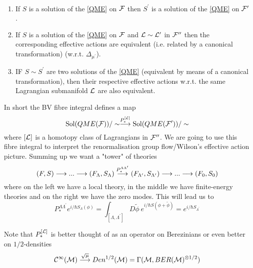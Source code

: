 \begin{corollary}~
  \begin{enumerate}
    \item If $S$ is a solution of the \eqref{QME} on ${\mathcal{F}}$ then $S^\prime$ is a solution of the \eqref{QME} on ${\mathcal{F}}^\prime$.

    \item If $S$ is a solution of the \eqref{QME} on ${\mathcal{F}}$ and $\mathcal{L} \sim \mathcal{L}^\prime$ in ${\mathcal{F}}^{\prime\prime}$ then the corresponding effective actions are equivalent (i.e. related by a canonical transformation) (w.r.t. $\Delta_{\mu^\prime}$).

    \item IF $S \sim S^\prime$ are two solutions of the \eqref{QME} (equivalent by means of a canonical transformation), then their respective effective actions w.r.t. the same Lagrangian submanifold $\mathcal{L}$ are also equivalent.
  \end{enumerate}
\end{corollary}

In short the BV fibre integral defines a map
\begin{equation}
  \operatorname{Sol}(QME({\mathcal{F}}))/\sim \overset{P_*^{[\mathcal{L}]}}{\longrightarrow} \operatorname{Sol}(QME({\mathcal{F}}^\prime))/\sim
\end{equation}
where $[\mathcal{L}]$ is a homotopy class of Lagrangians in ${\mathcal{F}}^{\prime\prime}$. We are going to use this fibre integral to interpret the renormalisation group flow/Wilson's effective action picture. Summing up we want a "tower" of theories
\begin{equation}
  (F,S) \longrightarrow ... \longrightarrow (F_\Lambda, S_\Lambda) \overset{P_*^{\Lambda \Lambda^\prime}}{\longrightarrow} (F_{\Lambda^\prime}, S_{\Lambda^\prime}) \longrightarrow ... \longrightarrow (F_0, S_0)
\end{equation}
where on the left we have a local theory, in the middle we have finite-energy theories and on the right we have the zero modes. This will lead us to
\begin{equation}
  P_*^{\Lambda \Lambda^\prime} e^{i/\hbar S_\Lambda(\phi)} = \int_{[\Lambda, \Lambda^\prime]} D\widetilde{\phi} \ e^{i/\hbar S(\phi + \widetilde{\phi})} = e^{i/\hbar S_{\Lambda^\prime}}
\end{equation}

\begin{rem}
  Note that $P_*^{[\mathcal{L}]}$ is better thought of as an operator on Berezinians or even better on $1/2$-densities
  \begin{equation}
    \mathcal{C}^{\infty}(\mathcal{M}) \overset{\sqrt{\mu}}{\longrightarrow} Den^{1/2}(\mathcal{M}) = \Gamma(\mathcal{M}, BER(\mathcal{M})^{\otimes 1/2})
  \end{equation}
\end{rem}
